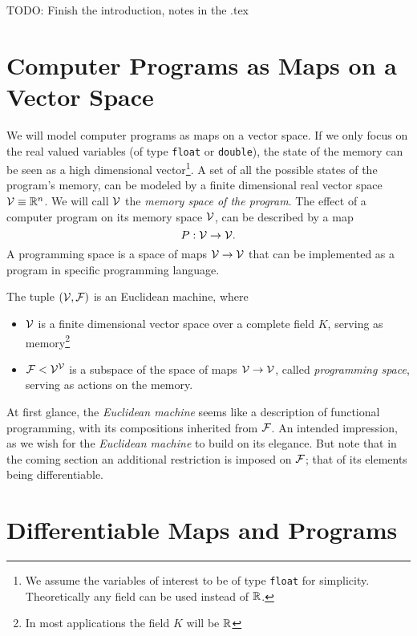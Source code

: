TODO: Finish the introduction, notes in the .tex



\section{Computer Programs as Maps on a Vector Space}

We will model computer programs as maps on a vector space. If
we only focus on the real valued variables (of type \texttt{float} or
\texttt{double}), the state of the memory can be seen as a high
dimensional vector\footnote{We assume the variables of interest to be of type \texttt{float} for
  simplicity. Theoretically any field can be used instead of $\mathbb{R}$.}. 
A set of all the possible states of the program's memory,
can be modeled by a finite dimensional real vector space $\mathcal{V}\equiv \mathbb{R}^n$. We
will call $\mathcal{V}$ the \emph{memory space of the program}. The effect of a computer
program on its memory space $\mathcal{V}$, can be described by a map
\begin{equation}
  \label{eq:map}
  P:\mathcal{V}\to \mathcal{V}.
\end{equation}
A programming space is a space of maps $\mathcal{V}\to\mathcal{V}$ that can be implemented as a
program in specific programming language. 
\begin{definition} The tuple $(\mathcal{V},\mathcal{F})$ is an Euclidean machine, where
  \begin{itemize}
  \item
  $\mathcal{V}$ is a finite dimensional vector space over a complete field $K$, serving
  as memory\footnote{In most applications the field $K$ will
    be $\mathbb{R}$}
  \item
  $\mathcal{F}< \mathcal{V}^{\mathcal{V}}$ is a subspace of the space of maps $\mathcal{V}\to \mathcal{V}$, called \emph{programming space}, serving as actions on the memory.
  \end{itemize}  
\end{definition}

At first glance, the \emph{Euclidean machine} seems like a description of functional programming, with its compositions inherited from $\mathcal{F}$. An intended impression, as we wish for the \emph{Euclidean machine} to build on its elegance. But note that in the coming section an additional restriction is imposed on $\mathcal{F}$; that of its elements being differentiable.

\section{Differentiable Maps and Programs}

